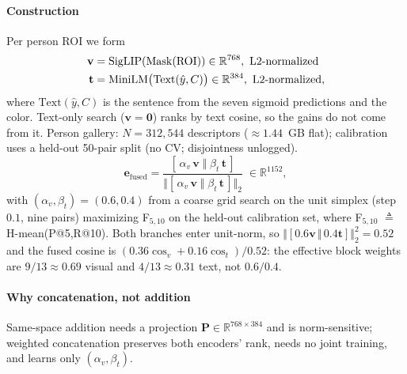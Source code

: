 ﻿\documentclass[conference]{IEEEtran}
\theoremstyle{plain}
\begin{document}
\paragraph*{Construction}
Per person ROI we form
\begin{align}
\mathbf{v} &= \mathrm{SigLIP}(\mathrm{Mask}(\mathrm{ROI})) \in\mathbb{R}^{768},\ \text{L2-normalized} \notag\\
\mathbf{t} &= \mathrm{MiniLM}\bigl(\mathrm{Text}(\hat{y}, C)\bigr) \in\mathbb{R}^{384},\ \text{L2-normalized},
\end{align}
where $\mathrm{Text}(\hat{y}, C)$ is the sentence from the seven sigmoid predictions and the color. Text-only search ($\mathbf{v}{=}\mathbf{0}$) ranks by text cosine, so the gains do not come from it. Person gallery: $N{=}312{,}544$ descriptors ($\approx{1.44}$~GB flat); calibration uses a held-out 50-pair split (no CV; disjointness unlogged).
\begin{equation}
\mathbf{e}_{\text{fused}} = \frac{[\,\alpha_v\,\mathbf{v}\;\Vert\;\beta_t\,\mathbf{t}\,]}{\bigl\Vert [\,\alpha_v\,\mathbf{v}\;\Vert\;\beta_t\,\mathbf{t}\,]\bigr\Vert_2}\;\in\mathbb{R}^{1152},
\label{eq:fusion}
\end{equation}
with $(\alpha_v,\beta_t)=(0.6, 0.4)$ from a coarse grid search on the unit simplex (step $0.1$, nine pairs) maximizing F$_{5,10}$ on the held-out calibration set, where F$_{5,10}$ $\triangleq$ H-mean(P@5,R@10). Both branches enter unit-norm, so $\Vert[0.6\mathbf{v}\,\Vert\,0.4\mathbf{t}]\Vert_2^2{=}0.52$ and the fused cosine is $(0.36\cos_v{+}0.16\cos_t)/0.52$: the effective block weights are $9/13{\approx}0.69$ visual and $4/13{\approx}0.31$ text, not $0.6/0.4$.

\paragraph*{Why concatenation, not addition}
Same-space addition needs a projection $\mathbf{P}\in\mathbb{R}^{768\times 384}$ and is norm-sensitive; weighted concatenation preserves both encoders' rank, needs no joint training, and learns only $(\alpha_v,\beta_t)$.
\end{document}
